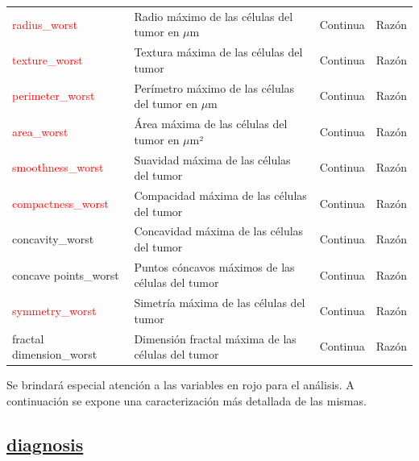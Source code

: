 \documentclass[a4paper, 12pt]{article}
\begin{document}
\begin{center}
\begin{tabular}{|p{3.5cm}|p{5.5cm}|p{3cm}|p{2.5cm}|}
            
            \textcolor{red}{radius\_worst} & Radio máximo de las células del tumor en $\mu$m & Continua & Razón \\
            
            \textcolor{red}{texture\_worst} & Textura máxima de las células del tumor & Continua & Razón \\
     
            
            \textcolor{red}{perimeter\_worst} & Perímetro máximo de las células del tumor en $\mu$m & Continua & Razón \\
            
            \textcolor{red}{area\_worst} & Área máxima de las células del tumor en $\mu$m² & Continua & Razón \\
            
            \textcolor{red}{smoothness\_worst} & Suavidad máxima de las células del tumor & Continua & Razón \\
            
            \textcolor{red}{compactness\_worst} & Compacidad máxima de las células del tumor & Continua & Razón \\
            
            concavity\_worst & Concavidad máxima de las células del tumor & Continua & Razón \\
            
            concave points\_worst & Puntos cóncavos máximos de las células del tumor & Continua & Razón \\
            
            \textcolor{red}{symmetry\_worst} & Simetría máxima de las células del tumor & Continua & Razón \\
            
            fractal dimension\_worst & Dimensión fractal máxima de las células del tumor & Continua & Razón \\
            \hline
        \end{tabular}
       
\end{center}


 
Se brindará especial atención a las variables en rojo para el análisis. A continuación se expone una caracterización más detallada de las mismas.


\subsection*{\underline{diagnosis}}
\end{document}
